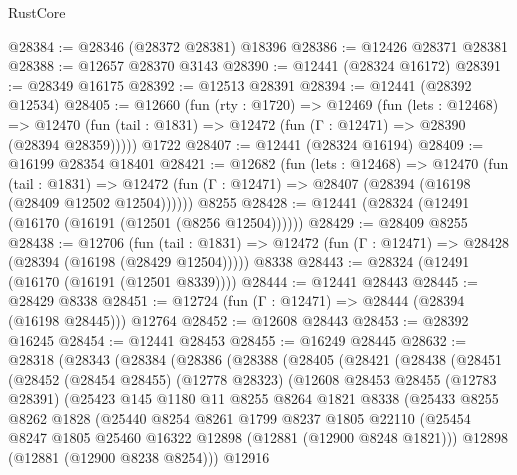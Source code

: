 \begin{lexlean}{RustCore}
\begin{coremodule}
@28384 := @28346 (@28372 @28381) @18396
@28386 := @12426 @28371 @28381
@28388 := @12657 @28370 @3143
@28390 := @12441 (@28324 @16172)
@28391 := @28349 @16175
@28392 := @12513 @28391
@28394 := @12441 (@28392 @12534)
@28405 := @12660
    (fun (rty : @1720) =>
    @12469
      (fun (lets : @12468) =>
      @12470 (fun (tail : @1831) => @12472 (fun (Γ : @12471) => @28390 (@28394 @28359)))))
    @1722
@28407 := @12441 (@28324 @16194)
@28409 := @16199 @28354 @18401
@28421 := @12682
    (fun (lets : @12468) =>
    @12470
      (fun (tail : @1831) =>
      @12472 (fun (Γ : @12471) => @28407 (@28394 (@16198 (@28409 @12502 @12504))))))
    @8255
@28428 := @12441 (@28324 (@12491 (@16170 (@16191 (@12501 (@8256 @12504))))))
@28429 := @28409 @8255
@28438 := @12706
    (fun (tail : @1831) => @12472 (fun (Γ : @12471) => @28428 (@28394 (@16198 (@28429 @12504)))))
    @8338
@28443 := @28324 (@12491 (@16170 (@16191 (@12501 @8339))))
@28444 := @12441 @28443
@28445 := @28429 @8338
@28451 := @12724 (fun (Γ : @12471) => @28444 (@28394 (@16198 @28445))) @12764
@28452 := @12608 @28443
@28453 := @28392 @16245
@28454 := @12441 @28453
@28455 := @16249 @28445
@28632 := @28318
    (@28343
      (@28384
        (@28386
          (@28388
            (@28405
              (@28421
                (@28438
                  (@28451
                    (@28452
                      (@28454 @28455)
                      (@12778 @28323)
                      (@12608
                        @28453
                        @28455
                        (@12783 @28391)
                        (@25423
                          @145
                          @1180
                          @11
                          @8255
                          @8264
                          @1821
                          @8338
                          (@25433
                            @8255
                            @8262
                            @1828
                            (@25440
                              @8254
                              @8261
                              @1799
                              @8237
                              @1805
                              @22110
                              (@25454
                                @8247
                                @1805
                                @25460
                                @16322
                                @12898
                                (@12881 (@12900 @8248 @1821)))
                              @12898
                              (@12881 (@12900 @8238 @8254)))
                            @12916

\end{coremodule}
\end{lexlean}
